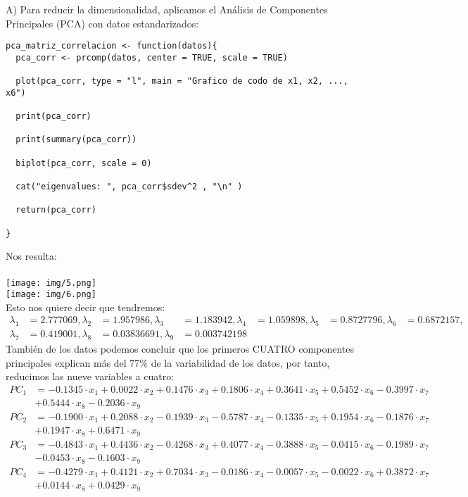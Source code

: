 \begin{sol}A)
Para reducir la dimensionalidad, aplicamos el Análisis de Componentes Principales (PCA) con datos estandarizados:
\begin{verbatim}
pca_matriz_correlacion <- function(datos){
  pca_corr <- prcomp(datos, center = TRUE, scale = TRUE)

  plot(pca_corr, type = "l", main = "Grafico de codo de x1, x2, ..., x6")

  print(pca_corr)

  print(summary(pca_corr))

  biplot(pca_corr, scale = 0)

  cat("eigenvalues: ", pca_corr$sdev^2 , "\n" )

  return(pca_corr)

}
\end{verbatim}
Nos resulta:\\\\
\texttt{[image: img/5.png]}\\
\texttt{[image: img/6.png]}\\
Esto nos quiere decir que tendremos:
\begin{align*}
\lambda_1 &= 2.777069, 
\lambda_2 &= 1.957986, 
\lambda_3 &= 1.183942, 
\lambda_4 &= 1.059898, 
\lambda_5 &= 0.8727796, 
\lambda_6 &= 0.6872157, \\
\lambda_7 &= 0.419001, 
\lambda_8 &= 0.03836691, 
\lambda_9 &= 0.003742198
\end{align*}
También de los datos podemos concluir que los primeros CUATRO componentes principales explican más del 77\% de la variabilidad de los datos, por tanto, reducimos las nueve variables a cuatro:
\begin{align*}
PC_1 &= -0.1345 \cdot x_1 + 0.0022 \cdot x_2 + 0.1476 \cdot x_3 + 0.1806 \cdot x_4 + 0.3641 \cdot x_5 + 0.5452 \cdot x_6 - 0.3997 \cdot x_7 \\ & + 0.5444 \cdot x_8 - 0.2036 \cdot x_9 \\
PC_2 &= -0.1900 \cdot x_1 + 0.2088 \cdot x_2 - 0.1939 \cdot x_3 - 0.5787 \cdot x_4 - 0.1335 \cdot x_5 + 0.1954 \cdot x_6 - 0.1876 \cdot x_7\\ & + 0.1947 \cdot x_8 + 0.6471 \cdot x_9 \\
PC_3 &= -0.4843 \cdot x_1 + 0.4436 \cdot x_2 - 0.4268 \cdot x_3 + 0.4077 \cdot x_4 - 0.3888 \cdot x_5 - 0.0415 \cdot x_6 - 0.1989 \cdot x_7 \\ &- 0.0453 \cdot x_8 - 0.1603 \cdot x_9 \\
PC_4 &= -0.4279 \cdot x_1 + 0.4121 \cdot x_2 + 0.7034 \cdot x_3 - 0.0186 \cdot x_4 - 0.0057 \cdot x_5 - 0.0022 \cdot x_6 + 0.3872 \cdot x_7 \\ &+ 0.0144 \cdot x_8 + 0.0429 \cdot x_9
\end{align*}


\end{sol}
